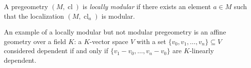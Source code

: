A pregeometry $(M, \operatorname{cl})$ is \emph{locally modular} if there exists an element $a \in M$ such that the localization $(M, \operatorname{cl}_a)$ is modular.

An example of a locally modular but not modular pregeometry is an affine geometry over a field $K$: a $K$-vector space $V$ with a set $\{v_0, v_1, \ldots, v_n\} \subseteq V$ considered dependent if and only if $\{v_1 - v_0, \ldots, v_n - v_0\}$ are $K$-linearly dependent.
